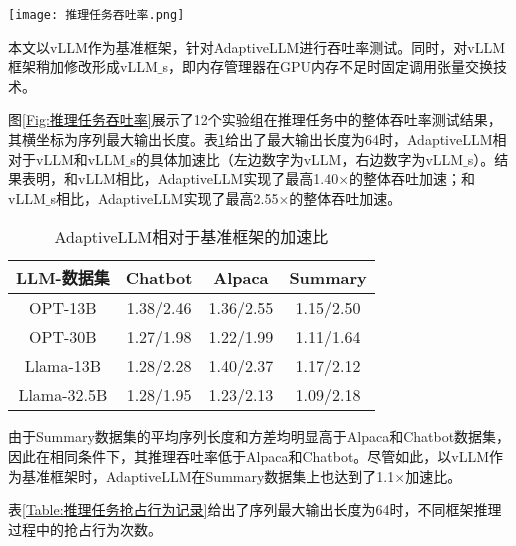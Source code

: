 \begin{figure*}[!htbp]
  \centering
  \texttt{[image: 推理任务吞吐率.png]}
  \caption{推理任务吞吐率}
  \label{Fig:推理任务吞吐率}
\end{figure*}

本文以vLLM作为基准框架，针对AdaptiveLLM进行吞吐率测试。同时，对vLLM框架稍加修改形成vLLM$\_$s，即内存管理器在GPU内存不足时固定调用张量交换技术。

图\ref{Fig:推理任务吞吐率}展示了12个实验组在推理任务中的整体吞吐率测试结果，其横坐标为序列最大输出长度。表\ref{Table:AdaptiveLLM相对于基准框架的加速比}给出了最大输出长度为64时，AdaptiveLLM相对于vLLM和vLLM$\_$s的具体加速比（左边数字为vLLM，右边数字为vLLM$\_$s）。结果表明，和vLLM相比，AdaptiveLLM实现了最高1.40$\times$的整体吞吐加速；和vLLM$\_$s相比，AdaptiveLLM实现了最高2.55$\times$的整体吞吐加速。

\begin{table}[H]
  \centering
  \caption{AdaptiveLLM相对于基准框架的加速比}
  \label{Table:AdaptiveLLM相对于基准框架的加速比}
  \renewcommand{\arraystretch}{1.3}
  \small
  \begin{tabular}{c c c c}
    \toprule
    \textbf{LLM-数据集} & \textbf{Chatbot} & \textbf{Alpaca} & \textbf{Summary} \\
    \midrule
    OPT-13B	& 1.38/2.46 & 1.36/2.55 & 1.15/2.50 \\
    OPT-30B	& 1.27/1.98 & 1.22/1.99 & 1.11/1.64 \\
    Llama-13B & 1.28/2.28 & 1.40/2.37 & 1.17/2.12 \\
    Llama-32.5B & 1.28/1.95 & 1.23/2.13 & 1.09/2.18 \\
    \bottomrule
  \end{tabular}
\end{table}

由于Summary数据集的平均序列长度和方差均明显高于Alpaca和Chatbot数据集，因此在相同条件下，其推理吞吐率低于Alpaca和Chatbot。尽管如此，以vLLM作为基准框架时，AdaptiveLLM在Summary数据集上也达到了1.1$\times$加速比。

表\ref{Table:推理任务抢占行为记录}给出了序列最大输出长度为64时，不同框架推理过程中的抢占行为次数。

